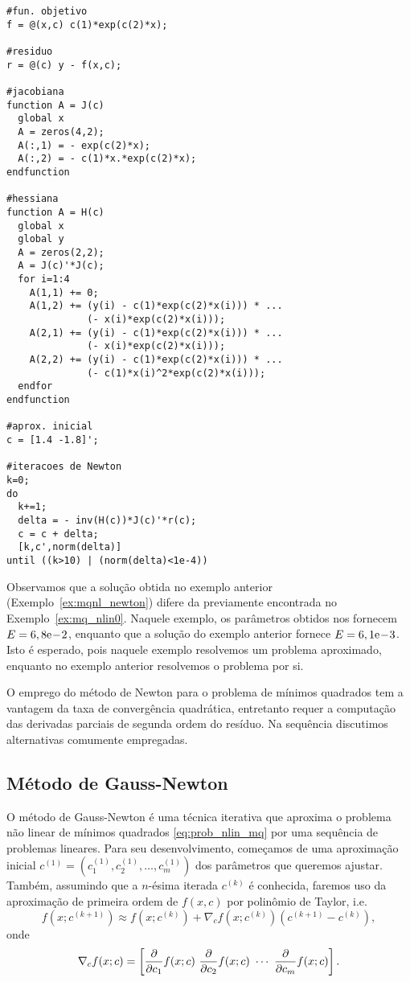 \begin{ex}
\begin{verbatim}
#fun. objetivo
f = @(x,c) c(1)*exp(c(2)*x);

#residuo
r = @(c) y - f(x,c);

#jacobiana
function A = J(c)
  global x
  A = zeros(4,2);
  A(:,1) = - exp(c(2)*x);
  A(:,2) = - c(1)*x.*exp(c(2)*x);
endfunction

#hessiana
function A = H(c)
  global x
  global y
  A = zeros(2,2);
  A = J(c)'*J(c);
  for i=1:4
    A(1,1) += 0;
    A(1,2) += (y(i) - c(1)*exp(c(2)*x(i))) * ...
              (- x(i)*exp(c(2)*x(i)));
    A(2,1) += (y(i) - c(1)*exp(c(2)*x(i))) * ...
              (- x(i)*exp(c(2)*x(i)));
    A(2,2) += (y(i) - c(1)*exp(c(2)*x(i))) * ...
              (- c(1)*x(i)^2*exp(c(2)*x(i)));
  endfor
endfunction

#aprox. inicial
c = [1.4 -1.8]';

#iteracoes de Newton
k=0;
do
  k+=1;
  delta = - inv(H(c))*J(c)'*r(c);
  c = c + delta;
  [k,c',norm(delta)]
until ((k>10) | (norm(delta)<1e-4))
\end{verbatim}
\fi
\end{ex}

Observamos que a solução obtida no exemplo anterior (Exemplo~\ref{ex:mqnl_newton}) difere da previamente encontrada no Exemplo~\ref{ex:mq_nlin0}. Naquele exemplo, os parâmetros obtidos nos fornecem $E = 6,8\mathrm{e}\!-\!2$, enquanto que a solução do exemplo anterior fornece $E = 6,1\mathrm{e}\!-\!3$. Isto é esperado, pois naquele exemplo resolvemos um problema aproximado, enquanto no exemplo anterior resolvemos o problema por si.

O emprego do método de Newton para o problema de mínimos quadrados tem a vantagem da taxa de convergência quadrática, entretanto requer a computação das derivadas parciais de segunda ordem do resíduo. Na sequência discutimos alternativas comumente empregadas.

\subsection{Método de Gauss-Newton}

O método de Gauss-Newton é uma técnica iterativa que aproxima o problema não linear de mínimos quadrados \eqref{eq:prob_nlin_mq} por uma sequência de problemas lineares. Para seu desenvolvimento, começamos de uma aproximação inicial $c^{(1)} = (c_1^{(1)}, c_2^{(1)}, \dotsc, c_m^{(1)})$ dos parâmetros que queremos ajustar. Também, assumindo que a $n$-ésima iterada $c^{(k)}$ é conhecida, faremos uso da aproximação de primeira ordem de $f(x,c)$ por polinômio de Taylor, i.e.
\begin{equation}
  f(x;c^{(k+1)}) \approx f(x;c^{(k)}) + \nabla_c f(x;c^{(k)})(c^{(k+1)}-c^{(k)}),
\end{equation}
onde
\begin{equation}
  \nabla_c f(x;c) = \left[\frac{\partial}{\partial c_1}f(x;c) ~\frac{\partial}{\partial c_2}f(x;c) ~\cdots ~\frac{\partial}{\partial c_m}f(x;c)\right].
\end{equation}

